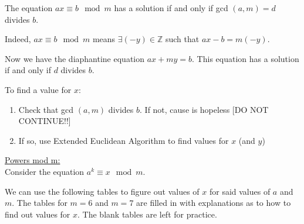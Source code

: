 The equation $ax \equiv b \mod m$ has a solution if and only if gcd $(a, m) =d$ divides $b$.
\item Indeed, $ax \equiv b \mod m$ means $\exists (-y) \in \mathbb{Z}$ such that $ax-b = m(-y)$.
\item Now we have the diaphantine equation $ax+my=b$. This equation has a solution if and only if $d$ divides $b$. 
\item To find a value for $x$:
\begin{enumerate}
\item Check that gcd $(a, m)$ divides $b$. If not, cause is hopeless [DO NOT CONTINUE!!]
\item If so, use Extended Euclidean Algorithm to find values for $x$ (and $y$)
\end{enumerate}
\underline{Powers mod m:}\\
Consider the equation $a^k \equiv x \mod m$.
\item We can use the following tables to figure out values of $x$ for said values of $a$ and $m$.
The tables for $m=6$ and $m=7$ are filled in with explanations as to how to find out values for $x$. The blank tables are left for practice.
